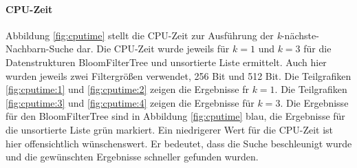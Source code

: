\begin{figure}[hpbt]
	\hspace{0.01\textwidth}
\end{figure}
\paragraph*{CPU-Zeit} 
Abbildung \ref{fig:cputime} stellt die CPU-Zeit zur Ausführung der \textit{k}-nächste-Nachbarn-Suche dar. Die CPU-Zeit wurde jeweils für $k=1$ und $k=3$ für die Datenstrukturen BloomFilterTree und unsortierte Liste ermittelt. Auch hier wurden jeweils zwei Filtergrößen verwendet, 256 Bit und 512 Bit. Die Teilgrafiken \ref{fig:cputime:1} und \ref{fig:cputime:2} zeigen die Ergebnisse fr $k=1$. Die Teilgrafiken \ref{fig:cputime:3} und \ref{fig:cputime:4} zeigen die Ergebnisse für $k=3$. Die Ergebnisse für den BloomFilterTree sind in Abbildung \ref{fig:cputime} blau, die Ergebnisse für die unsortierte Liste grün markiert. Ein niedrigerer Wert für die CPU-Zeit ist hier offensichtlich wünschenswert. Er bedeutet, dass die Suche beschleunigt wurde und die gewünschten Ergebnisse schneller gefunden wurden. 
